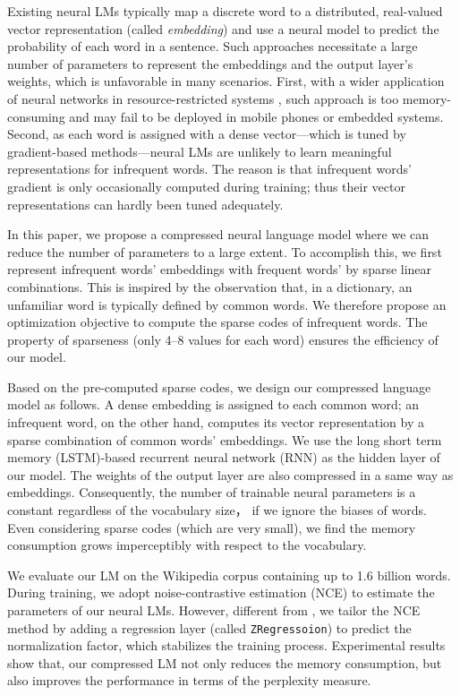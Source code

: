 \documentclass[11pt]{article}
\begin{document}
Existing neural LMs typically map a discrete word to a distributed, real-valued vector representation (called \textit{embedding}) and use a neural model to predict the probability of each word in a sentence.
Such approaches necessitate a large number of parameters to represent the embeddings and the output layer's weights, which is unfavorable in many scenarios. First, with a wider application of neural networks in resource-restricted systems \cite{distill}, such approach is too memory-consuming and may fail to be deployed in mobile phones or embedded systems. Second, as each word is assigned with a dense vector---which is tuned by gradient-based methods---neural LMs are unlikely to learn meaningful representations for infrequent words. The reason is that infrequent words' gradient is only occasionally computed during training; thus their vector representations can hardly been tuned adequately.

In this paper, we propose a compressed neural language model where we can reduce the number of parameters to a large extent. To accomplish this, we first represent infrequent words' embeddings with frequent words' by sparse linear combinations. This is inspired by the observation that, in a dictionary, an unfamiliar word is typically defined by common words. We therefore propose an optimization objective to compute the sparse codes of infrequent words. The property of sparseness (only 4--8 values for each word) ensures the efficiency of our model.

Based on the pre-computed sparse codes, we design our compressed language model as follows.
A dense embedding is assigned to each common word;
an infrequent word, on the other hand, computes its vector representation by a sparse combination of common words' embeddings.
We use the long short term memory (LSTM)-based recurrent neural network (RNN) as the hidden layer of our model.
The weights of the output layer
are also compressed in a same way as embeddings.
Consequently, the number of trainable neural parameters is a constant regardless of the vocabulary size， if we ignore the biases of words. Even considering sparse codes (which are very small), we find the memory consumption grows imperceptibly with respect to the vocabulary.

We evaluate our LM on the Wikipedia corpus containing up to 1.6 billion words.
During training, we adopt noise-contrastive estimation (NCE) \cite{Gutmann:2012tr}
to estimate the parameters of our neural LMs.
However, different from ,
we tailor the NCE method by adding a regression layer (called \texttt{ZRegressoion}) to predict the normalization factor,
which stabilizes the training process.
Experimental results show that, our compressed LM not only reduces the memory consumption, but also improves the performance in terms of the perplexity measure.
\end{document}
